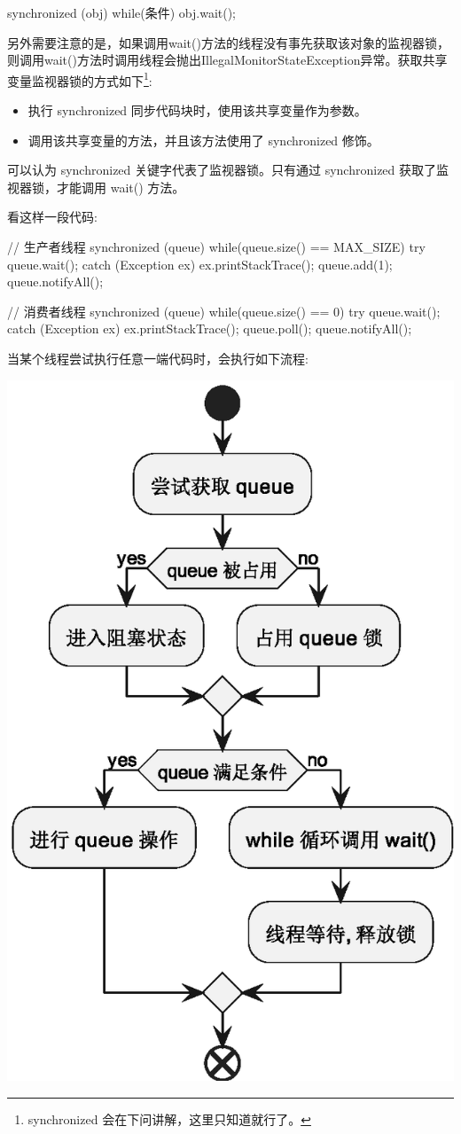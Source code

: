 \begin{Java}
synchronized (obj) {
    while(条件) {
        obj.wait();
    }
}
\end{Java}


另外需要注意的是，如果调用wait()方法的线程没有事先获取该对象的监视器锁，则调用wait()方法时调用线程会抛出IllegalMonitorStateException异常。获取共享变量监视器锁的方式如下\footnote{synchronized 会在下问讲解，这里只知道就行了。}:
\begin{itemize}
    \item 执行 synchronized 同步代码块时，使用该共享变量作为参数。
    \item 调用该共享变量的方法，并且该方法使用了 synchronized 修饰。
\end{itemize}

可以认为 synchronized 关键字代表了监视器锁。只有通过 synchronized 获取了监视器锁，才能调用 wait() 方法。

看这样一段代码:
\begin{Java}
// 生产者线程
synchronized (queue) {
    while(queue.size() == MAX_SIZE) {
        try {
            queue.wait();
        } catch (Exception ex) {
            ex.printStackTrace();
        }
    }
    queue.add(1);
    queue.notifyAll();
}

// 消费者线程
synchronized (queue) {
    while(queue.size() == 0) {
        try {
            queue.wait();
        } catch (Exception ex) {
            ex.printStackTrace();
        }
    }
    queue.poll();
    queue.notifyAll();
}
\end{Java}

当某个线程尝试执行任意一端代码时，会执行如下流程:

\begin{center}
    \includegraphics[width=0.4\linewidth]{../../Images/syn.eps}
\end{center}

